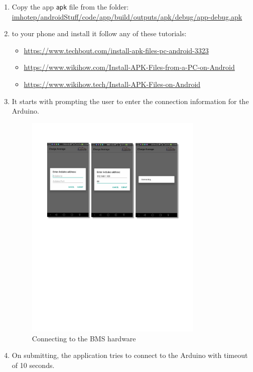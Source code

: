 \begin{enumerate}
\item Copy the app \texttt{apk} file from the folder:\\
\url{imhotep/androidStuff/code/app/build/outputs/apk/debug/app-debug.apk}
\item to your phone and install it follow any of these tutorials:
    \begin{itemize}
        \item \url{https://www.techbout.com/install-apk-files-pc-android-3323}
        \item \url{https://www.wikihow.com/Install-APK-Files-from-a-PC-on-Android}
        \item \url{https://www.wikihow.tech/Install-APK-Files-on-Android}
    \end{itemize}
    \item It starts with prompting the user to enter the connection information for the Arduino.
    \begin{figure}[h]
        \centering
        \includegraphics[width=0.8\textwidth,page=1]{figures/androidFigs}
        \caption{Connecting to the BMS hardware}
        \label{fig:appConfig}
    \end{figure}
    \item On submitting, the application tries to connect to the Arduino with timeout of 10 seconds.

\end{enumerate}
